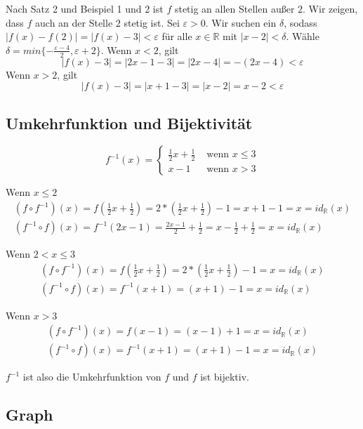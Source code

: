 \documentclass[a4paper,10pt]{article}
\begin{document}
Nach Satz 2 und Beispiel 1 und 2 ist $f$ stetig an allen Stellen außer $2$.
Wir zeigen, dass $f$ auch an der Stelle $2$ stetig ist.
Sei $\varepsilon > 0$.
Wir suchen ein $\delta$, sodass $|f(x) - f(2)| = |f(x) - 3| < \varepsilon$ für alle $x \in \mathbb{R}$ mit $|x - 2| < \delta$.
Wähle $\delta = min \{ -\frac{\varepsilon - 4}{2}, \varepsilon + 2 \}$.
Wenn $x < 2$, gilt
\begin{equation}
 |f(x) - 3| = |2x - 1 - 3| = |2x - 4| = -(2x - 4) < \varepsilon
\end{equation}
Wenn $x > 2$, gilt
\begin{equation}
 |f(x) - 3| = |x + 1 - 3| = |x - 2| = x - 2 < \varepsilon
\end{equation}

\subsection*{Umkehrfunktion und Bijektivität}

\begin{equation}
 f^{-1}(x) = \begin{cases}
              \frac{1}{2} x + \frac{1}{2} & \text{ wenn $x \le 3$}\\
              x - 1 & \text{ wenn $x > 3$}
             \end{cases}
\end{equation}

Wenn $x \le 2$
\begin{align}
 (f \circ f^{-1})(x) = f(\frac{1}{2} x + \frac{1}{2}) = 2 * (\frac{1}{2} x + \frac{1}{2}) - 1 = x + 1 - 1 = x = id_\mathbb{R}(x)\\
 (f^{-1} \circ f)(x) = f^{-1}(2x - 1) = \frac{2x - 1}{2} + \frac{1}{2} = x - \frac{1}{2} + \frac{1}{2} = x = id_\mathbb{R}(x)
\end{align}

Wenn $2 < x \le 3$
\begin{align}
 (f \circ f^{-1})(x) = f(\frac{1}{2} x + \frac{1}{2}) = 2 * (\frac{1}{2} x + \frac{1}{2}) - 1 = x = id_\mathbb{R}(x)\\
 (f^{-1} \circ f)(x) = f^{-1}(x + 1) = (x + 1) - 1 = x = id_\mathbb{R}(x)
\end{align}

Wenn $x > 3$
\begin{align}
 (f \circ f^{-1})(x) = f(x - 1) = (x - 1) + 1 = x = id_\mathbb{R}(x)\\
 (f^{-1} \circ f)(x) = f^{-1}(x + 1) = (x + 1) - 1 = x = id_\mathbb{R}(x)
\end{align}

$f^{-1}$ ist also die Umkehrfunktion von $f$ und $f$ ist bijektiv.

\subsection*{Graph}
\end{document}
